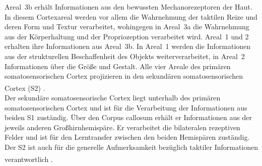 \newpage
Areal~3b erhält Informationen aus den bewussten Mechanorezeptoren der Haut. In diesem Cortexareal werden vor allem die Wahrnehmung der taktilen Reize und deren Form und Textur verarbeitet, wohingegen in Areal~3a die Wahrnehmung aus der Körperhaltung und der Propriozeption verarbeitet wird. Areal~1 und 2 erhalten ihre Informationen aus Areal~3b. In Areal~1 werden die Informationen aus der strukturellen Beschaffenheit des Objekts weiterverarbeitet, in Areal~2 Informationen über die Größe und Gestalt. Alle vier Areale des primären somatosensorischen Cortex projizieren in den sekundären somatosensorischen Cortex (S2) \textsuperscript{\cite[Kap.~12]{neurowissenschaften_baer}}.
\\
\noindent Der sekundäre somatosensorische Cortex  liegt unterhalb des primären somatosensorischen Cortex und ist für die Verarbeitung der Informationen aus beiden S1 zuständig. Über den Corpus callosum erhält er Informationen aus der jeweils anderen Großhirnhemispäre. Er verarbeitet die bilateralen rezeptiven Felder und ist für den Lerntransfer zwischen den beiden Hemispären zuständig. Der S2 ist auch für die generelle Aufmerksamkeit bezüglich taktiler Informationen verantwortlich \textsuperscript{\cite[Kap.~12]{neurowissenschaften_baer}}.

